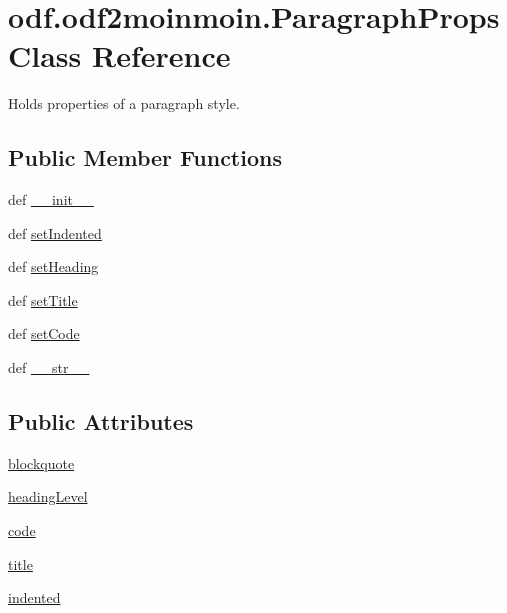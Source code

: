 \hypertarget{classodf_1_1odf2moinmoin_1_1ParagraphProps}{\section{odf.\+odf2moinmoin.\+Paragraph\+Props Class Reference}
\label{classodf_1_1odf2moinmoin_1_1ParagraphProps}
}


Holds properties of a paragraph style.  


\subsection*{Public Member Functions}
\begin{DoxyCompactItemize}
\item 
def \hyperlink{classodf_1_1odf2moinmoin_1_1ParagraphProps_a582c70bd1e2f9cf2d11de68d6c76dce6}{\+\_\+\+\_\+init\+\_\+\+\_\+}
\item 
def \hyperlink{classodf_1_1odf2moinmoin_1_1ParagraphProps_a663a09620f971a611e8d304fd36bec3a}{set\+Indented}
\item 
def \hyperlink{classodf_1_1odf2moinmoin_1_1ParagraphProps_ab29e261e50d77dfad31cc71b2b716ee6}{set\+Heading}
\item 
def \hyperlink{classodf_1_1odf2moinmoin_1_1ParagraphProps_a4930c204c5c4c67db90fe8843329f0df}{set\+Title}
\item 
def \hyperlink{classodf_1_1odf2moinmoin_1_1ParagraphProps_ab7c56961a9b1861e647c3aebef299940}{set\+Code}
\item 
def \hyperlink{classodf_1_1odf2moinmoin_1_1ParagraphProps_a328f88c1df29bf8601c5de00a7384fff}{\+\_\+\+\_\+str\+\_\+\+\_\+}
\end{DoxyCompactItemize}
\subsection*{Public Attributes}
\begin{DoxyCompactItemize}
\item 
\hyperlink{classodf_1_1odf2moinmoin_1_1ParagraphProps_a704170210d973d31aa7dc5476806e241}{blockquote}
\item 
\hyperlink{classodf_1_1odf2moinmoin_1_1ParagraphProps_add02ed417452383ebb8ba0ab6970d4e0}{heading\+Level}
\item 
\hyperlink{classodf_1_1odf2moinmoin_1_1ParagraphProps_ad457d0929cb99828502228afa531c77c}{code}
\item 
\hyperlink{classodf_1_1odf2moinmoin_1_1ParagraphProps_a93af567c9a73f9a410d228c7c4c6af3c}{title}
\item 
\hyperlink{classodf_1_1odf2moinmoin_1_1ParagraphProps_a2146e406f9b893c7040a8e403a22ccb3}{indented}
\end{DoxyCompactItemize}


